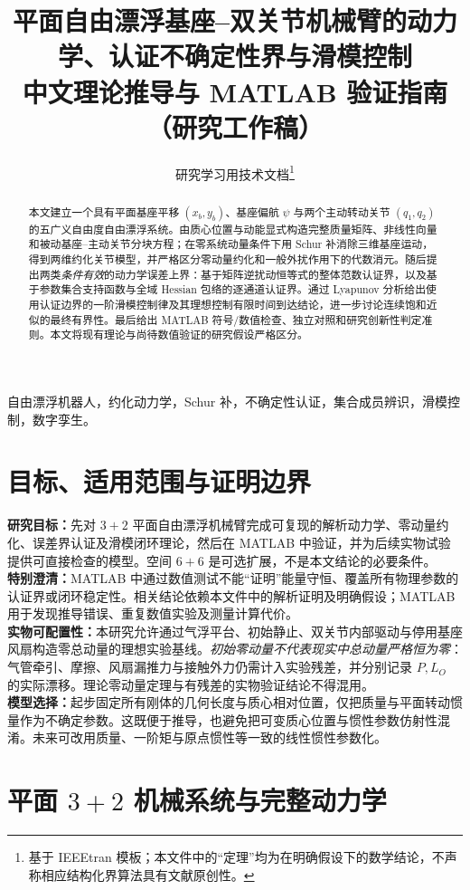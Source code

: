 \documentclass[journal,onecolumn]{IEEEtran}
\title{平面自由漂浮基座--双关节机械臂的动力学、认证不确定性界与滑模控制\\\large 中文理论推导与 MATLAB 验证指南（研究工作稿）}
\author{研究学习用技术文档\thanks{基于 IEEEtran 模板；本文件中的“定理”均为在明确假设下的数学结论，不声称相应结构化界算法具有文献原创性。}}
\date{}
\begin{document}
\maketitle
\begin{abstract}
本文建立一个具有平面基座平移 $(x_b,y_b)$、基座偏航 $\psi$ 与两个主动转动关节 $(q_1,q_2)$ 的五广义自由度自由漂浮系统。由质心位置与动能显式构造完整质量矩阵、非线性向量和被动基座--主动关节分块方程；在零系统动量条件下用 Schur 补消除三维基座运动，得到两维约化关节模型，并严格区分零动量约化和一般外扰作用下的代数消元。随后提出两类\emph{条件有效}的动力学误差上界：基于矩阵逆扰动恒等式的整体范数认证界，以及基于参数集合支持函数与全域 Hessian 包络的逐通道认证界。通过 Lyapunov 分析给出使用认证边界的一阶滑模控制律及其理想控制有限时间到达结论，进一步讨论连续饱和近似的最终有界性。最后给出 MATLAB 符号/数值检查、独立对照和研究创新性判定准则。本文将现有理论与尚待数值验证的研究假设严格区分。
\end{abstract}
\begin{IEEEkeywords}
自由漂浮机器人，约化动力学，Schur 补，不确定性认证，集合成员辨识，滑模控制，数字孪生。
\end{IEEEkeywords}
\tableofcontents
\section{目标、适用范围与证明边界}
\noindent\textbf{研究目标：}先对 $3+2$ 平面自由漂浮机械臂完成可复现的解析动力学、零动量约化、误差界认证及滑模闭环理论，然后在 MATLAB 中验证，并为后续实物试验提供可直接检查的模型。空间 $6+6$ 是可选扩展，不是本文结论的必要条件。\\
\textbf{特别澄清：}MATLAB 中通过数值测试不能“证明”能量守恒、覆盖所有物理参数的认证界或闭环稳定性。相关结论依赖本文件中的解析证明及明确假设；MATLAB 用于发现推导错误、重复数值实验及测量计算代价。\\
\textbf{实物可配置性：}本研究允许通过气浮平台、初始静止、双关节内部驱动与停用基座风扇构造零总动量的理想实验基线。\emph{初始零动量不代表现实中总动量严格恒为零}：气管牵引、摩擦、风扇漏推力与接触外力仍需计入实验残差，并分别记录 $P,L_O$ 的实际漂移。理论零动量定理与有残差的实物验证结论不得混用。\\
\textbf{模型选择：}起步固定所有刚体的几何长度与质心相对位置，仅把质量与平面转动惯量作为不确定参数。这既便于推导，也避免把可变质心位置与惯性参数仿射性混淆。未来可改用质量、一阶矩与原点惯性等一致的线性惯性参数化。

\section{平面 $3+2$ 机械系统与完整动力学}
\end{document}
